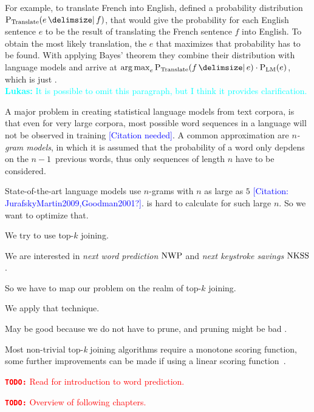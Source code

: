 \documentclass[m,bachelor,binding]{WeSTthesis}
\renewcommand\cref{\Cref}
\DeclareMathOperator*{\Argmax}{arg\,max}
\newenvironment{draft}{\color{draftcolor}}{}
\newcommand{\todo}[1]{\textcolor{red}{{\footnotesize\textbf{\texttt{TODO:}}} #1}}
\newcommand{\lukas}[1]{\textcolor{cyan}{{\footnotesize\textbf{Lukas:}} #1}}
\newcommand{\noref}{\textcolor{blue}{\footnotesize[Citation needed]}}
\newcommand{\mbref}[1]{\textcolor{blue}{\footnotesize[Citation: #1?]}}
\begin{document}
For example, to translate French into English, \cite{Brown1990} defined a
probability distribution $\Prob[\text{Translate}]{e}{f}$, that would give the
probability for each English sentence $e$ to be the result of translating
the French sentence $f$ into English.
To obtain the most likely translation, the $e$ that maximizes that probability
has to be found.
With applying Bayes' theorem they combine their distribution with language
models and arrive at
$\Argmax_{e} \Prob[\text{Translate}]{f}{e} \cdot \Prob[\text{LM}]{e}$, which is
just \cref{eq:noisychannelbayes}.
\\ \lukas{It is possible to omit this paragraph, but I think it provides
clarification.}

A major problem in creating statistical language models from text corpora, is
that even for very large corpora, most possible word sequences in a language
will not be observed in training \noref.
A common approximation are \emph{$n$-gram models}, in which it is assumed that
the probability of a word only depdens on the $n\!-\!1$~previous words, thus
only sequences of length $n$ have to be considered.

State-of-the-art language models use $n$-grams with $n$ as large as $5$
\mbref{JurafskyMartin2009,Goodman2001}.
\begin{draft}
 is hard to calculate for such large $n$.
So we want to optimize that.
\end{draft}

\begin{draft}
We try to use top-$k$ joining.

We are interested in \emph{next word prediction} $\NWP$ and
\emph{next keystroke savings} $\NKSS$.

So we have to map our problem on the realm of top-$k$ joining.

We apply that technique.

May be good because we do not have to prune, and pruning might be bad
\parencite{Stolcke2000,Chelba2013,Chelba2010,Siivola2007}.

Most non-trivial top-\emph{k} joining algorithms require a monotone scoring
function, some further improvements can be made if using a linear scoring
function~\parencite{Ilyas2008}.
\end{draft}

\todo{Read \cite{Bickel2005} for introduction to word prediction.}

\todo{Overview of following chapters.}
\end{document}
